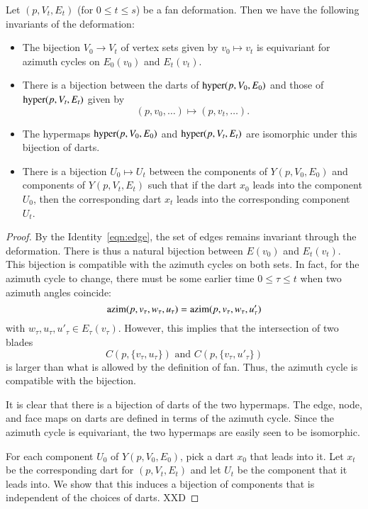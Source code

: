 \begin{lemma}  Let $(p,V_t,E_t)$ (for $0\le t\le s$) 
be a fan deformation. Then we have the following invariants
of the deformation:
\begin{itemize}
\item The bijection $V_0\to V_t$ of vertex sets
given by $v_0\mapsto v_t$ 
is equivariant for
azimuth cycles on $E_0(v_0)$ and $E_t(v_t)$.
\item There is a bijection between the darts of ${\operatorname{hyper}}(p,V_0,E_0)$
and those of ${\operatorname{hyper}}(p,V_t,E_t)$ given by
   $$(p,v_0,\ldots) \mapsto (p,v_t,\ldots).$$
\item The hypermaps ${\operatorname{hyper}}(p,V_0,E_0)$ and ${\operatorname{hyper}}(p,V_t,E_t)$
are isomorphic under this bijection of darts.
\item There is a bijection $U_0\mapsto U_t$ 
between the components of $Y(p,V_0,E_0)$
and components of $Y(p,V_t,E_t)$ such that if the dart $x_0$ leads into
the component $U_0$, then the corresponding dart $x_t$ leads into
the corresponding component $U_t$.
\end{itemize}
\end{lemma}

\begin{proof} By the Identity~\ref{eqn:edge}, the set of
edges remains invariant through the deformation.  There
is thus a natural bijection between $E(v_0)$ and $E_t(v_t)$.
This bijection is compatible with the azimuth cycles on both
sets.  In fact, for the azimuth cycle to change, there must
be some earlier time $0\le\tau \le t$ when two azimuth angles coincide:
$${\operatorname{azim}}(p,v_\tau,w_\tau,u_\tau) = {\operatorname{azim}}(p,v_\tau,w_\tau,u'_\tau)$$
with $w_\tau,u_\tau,u'_\tau\in E_\tau(v_\tau)$.  However, this
implies that the intersection of two blades 
   $$
   C(p,\{v_\tau,u_\tau\}) \text{ and } C(p,\{v_\tau,u'_\tau\})
   $$
is larger than what is allowed by the definition of fan.  Thus,
the azimuth cycle is compatible with the bijection.

It is clear that there is a bijection of darts of the two
hypermaps.   The edge, node, and face maps on darts are defined
in terms of the azimuth cycle.  Since the azimuth cycle is
equivariant, the two hypermaps are easily seen to be isomorphic.

For each component $U_0$ of $Y(p,V_0,E_0)$, pick a dart 
$x_0$ that leads
into it.  Let $x_t$ be the corresponding dart for $(p,V_t,E_t)$
and let  $U_t$ be the component that it leads into.  We show
that this induces a bijection of components that is independent
of the choices of darts.  XXD
\end{proof}

